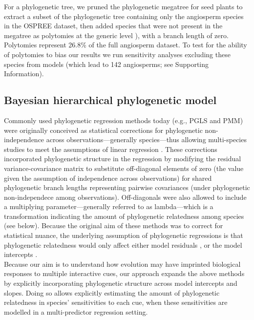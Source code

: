 \documentclass[11pt]{article}
\begin{document}
For a phylogenetic tree, we pruned  the phylogenetic megatree for seed plants \citep{smith2018constructing} to extract a subset of the phylogenetic tree containing only the angiosperm species in the OSPREE dataset, then added species that were not present in the megatree as polytomies at the generic level \citep[using the function `congeneric.merge' in][]{pearse2015pez}), with a branch length of zero. Polytomies represent 26.8\% of the full angiosperm dataset. To test for the ability of polytomies to bias our results we run sensitivity analyses excluding these species from models (which lead to 142 angiosperms; see Supporting Information). \\ 

\subsection*{Bayesian hierarchical phylogenetic model}
Commonly used phylogenetic regression methods today (e.g., PGLS and PMM) were originally conceived as statistical corrections for phylogenetic non-independence across observations---generally species---thus allowing multi-species studies to meet the assumptions of linear regression \citep{freckleton2002phylogenetic}. These corrections incorporated phylogenetic structure in the regression by modifying the residual variance-covariance matrix to substitute off-diagonal elements of zero (the value given the assumption of independence across observations) for shared phylogenetic branch lengths representing pairwise covariances (under phylogenetic non-independece among observations). Off-diagonals were also allowed to include a multiplying parameter---generally referred to as lambda---which is a transformation indicating the amount of phylogenetic relatedness among species (see below). Because the original aim of these methods was to correct for statistical nuance, the underlying assumption of phylogenetic regressions is that phylogenetic relatedness would only affect either model residuals \citep[in PGLS approaches,][]{freckleton2002phylogenetic}, or the model intercepts \citep[e.g., in many PMM approaches,][]{housworth2004phylogenetic}.\\ 

Because our aim is to understand how evolution may have imprinted biological responses to multiple interactive cues, our approach expands the above methods by explicitly incorporating phylogenetic structure across model intercepts and slopes. Doing so allows explicitly estimating the amount of phylogenetic relatedness in species' sensitivities to each cue, when these sensitivities are modelled in a multi-predictor regression setting.  
\end{document}
